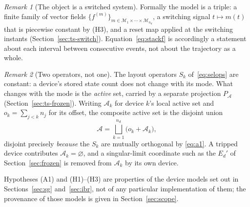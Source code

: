 \documentclass[12pt,a4paper]{article}
\theoremstyle{remark}
\newtheorem{remark}{Remark}
\begin{document}
\begin{remark}[The object is a switched system]\label{rem:switched}
Formally the model is a triple: a finite family of vector fields
$\{f^{(m)}\}_{m\in\mathcal{M}_1\times\cdots\times\mathcal{M}_{n_d}}$, a switching
signal $t\mapsto m(t)$ that is piecewise constant by (H3), and a reset map applied
at the switching instants (Section~\ref{sec:ts-switch}).
Equation~\eqref{eq:stackf} is accordingly a statement about each interval between
consecutive events, not about the trajectory as a whole.
\end{remark}

\begin{remark}[Two operators, not one]\label{rem:activeproj}
The layout operators $S_k$ of~\eqref{eq:selops} are constant: a device's stored
state count does not change with its mode. What changes with the mode is the
\emph{active} set, carried by a separate projection $P_{\mathcal{A}}$
(Section~\ref{sec:ts-frozen}). Writing $\mathcal{A}_k$ for device $k$'s local
active set and $o_k=\sum_{j<k}n_j$ for its offset, the composite active set is the
disjoint union
\begin{equation}
  \mathcal{A}=\bigsqcup_{k=1}^{n_d}\bigl(o_k+\mathcal{A}_k\bigr),
  \label{eq:activeunion}
\end{equation}
disjoint precisely \emph{because} the $S_k$ are mutually orthogonal by
\eqref{eq:a1}. A tripped device contributes $\mathcal{A}_k=\varnothing$, and a
singular-limit coordinate such as the $E_d'$ of Section~\ref{sec:frozen} is
removed from $\mathcal{A}_k$ by its own device.
\end{remark}

Hypotheses (A1) and (H1)--(H3) are properties of the device models set out in
Sections~\ref{sec:sg} and~\ref{sec:ibr}, not of any particular implementation of
them; the provenance of those models is given in Section~\ref{sec:scope}.
\end{document}
